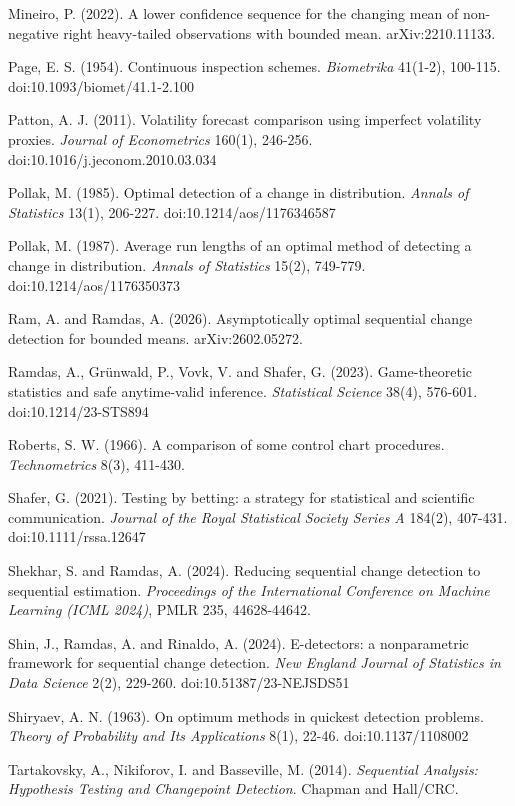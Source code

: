 \documentclass[
]{article}
\begin{document}
Mineiro, P. (2022). A lower confidence sequence for the changing mean of
non-negative right heavy-tailed observations with bounded mean.
arXiv:2210.11133.

Page, E. S. (1954). Continuous inspection schemes. \emph{Biometrika}
41(1-2), 100-115. doi:10.1093/biomet/41.1-2.100

Patton, A. J. (2011). Volatility forecast comparison using imperfect
volatility proxies. \emph{Journal of Econometrics} 160(1), 246-256.
doi:10.1016/j.jeconom.2010.03.034

Pollak, M. (1985). Optimal detection of a change in distribution.
\emph{Annals of Statistics} 13(1), 206-227. doi:10.1214/aos/1176346587

Pollak, M. (1987). Average run lengths of an optimal method of detecting
a change in distribution. \emph{Annals of Statistics} 15(2), 749-779.
doi:10.1214/aos/1176350373

Ram, A. and Ramdas, A. (2026). Asymptotically optimal sequential change
detection for bounded means. arXiv:2602.05272.

Ramdas, A., Grünwald, P., Vovk, V. and Shafer, G. (2023). Game-theoretic
statistics and safe anytime-valid inference. \emph{Statistical Science}
38(4), 576-601. doi:10.1214/23-STS894

Roberts, S. W. (1966). A comparison of some control chart procedures.
\emph{Technometrics} 8(3), 411-430.

Shafer, G. (2021). Testing by betting: a strategy for statistical and
scientific communication. \emph{Journal of the Royal Statistical Society
Series A} 184(2), 407-431. doi:10.1111/rssa.12647

Shekhar, S. and Ramdas, A. (2024). Reducing sequential change detection
to sequential estimation. \emph{Proceedings of the International
Conference on Machine Learning (ICML 2024)}, PMLR 235, 44628-44642.

Shin, J., Ramdas, A. and Rinaldo, A. (2024). E-detectors: a
nonparametric framework for sequential change detection. \emph{New
England Journal of Statistics in Data Science} 2(2), 229-260.
doi:10.51387/23-NEJSDS51

Shiryaev, A. N. (1963). On optimum methods in quickest detection
problems. \emph{Theory of Probability and Its Applications} 8(1), 22-46.
doi:10.1137/1108002

Tartakovsky, A., Nikiforov, I. and Basseville, M. (2014).
\emph{Sequential Analysis: Hypothesis Testing and Changepoint
Detection}. Chapman and Hall/CRC.
\end{document}
